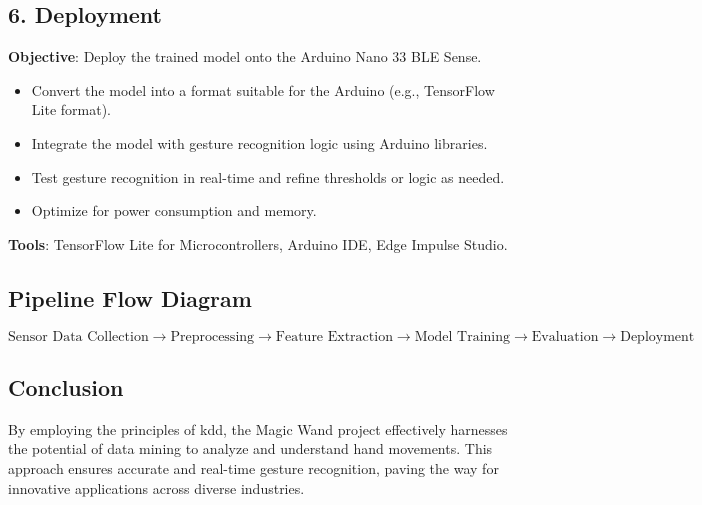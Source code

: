 \subsection{6. Deployment}
\textbf{Objective}: Deploy the trained model onto the Arduino Nano 33 BLE Sense.  
\begin{itemize}
    \item Convert the model into a format suitable for the Arduino (e.g., TensorFlow Lite format).
    \item Integrate the model with gesture recognition logic using Arduino libraries.
    \item Test gesture recognition in real-time and refine thresholds or logic as needed.
    \item Optimize for power consumption and memory.
\end{itemize}
\textbf{Tools}: TensorFlow Lite for Microcontrollers, Arduino IDE, Edge Impulse Studio.

\subsection{Pipeline Flow Diagram}
\[
\text{Sensor Data Collection} \rightarrow \text{Preprocessing} \rightarrow \text{Feature Extraction} \rightarrow \text{Model Training} \rightarrow \text{Evaluation} \rightarrow \text{Deployment}
\]

	
	\subsection{Conclusion}
	
	By employing the principles of \ac{kdd}, the Magic Wand project effectively harnesses the potential of data mining to analyze and understand hand movements. This approach ensures accurate and real-time gesture recognition, paving the way for innovative applications across diverse industries.
	

